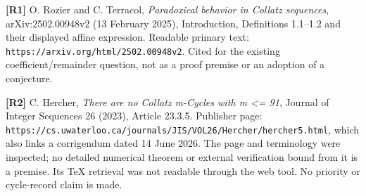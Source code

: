 \textbf{{[}R1{]}} O. Rozier and C. Terracol, \emph{Paradoxical behavior
in Collatz sequences}, arXiv:2502.00948v2 (13 February 2025),
Introduction, Definitions 1.1--1.2 and their displayed affine
expression. Readable primary text:
\nolinkurl{https://arxiv.org/html/2502.00948v2}. Cited for the existing
coefficient/remainder question, not as a proof premise or an adoption of
a conjecture.

\textbf{{[}R2{]}} C. Hercher, \emph{There are no Collatz m-Cycles with m
\textless= 91}, Journal of Integer Sequences 26 (2023), Article 23.3.5.
Publisher page:
\nolinkurl{https://cs.uwaterloo.ca/journals/JIS/VOL26/Hercher/hercher5.html},
which also links a corrigendum dated 14 June 2026. The page and
terminology were inspected; no detailed numerical theorem or external
verification bound from it is a premise. Its TeX retrieval was not
readable through the web tool. No priority or cycle-record claim is
made.
